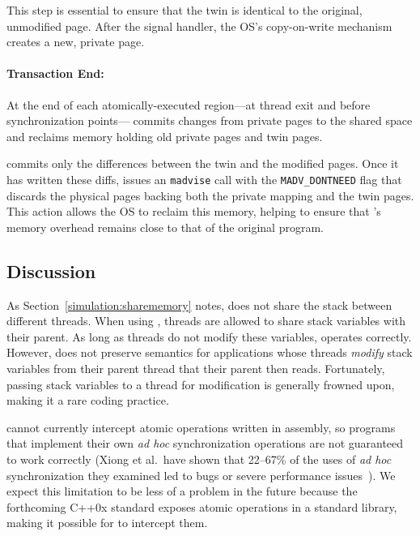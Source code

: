 This step is essential to ensure that the twin is identical to the
original, unmodified page. After the signal handler, the OS's
copy-on-write mechanism creates a new, private page.

\paragraph{Transaction End: } At the end of each atomically-executed
region---at thread exit and before synchronization
points---\sheriff{} commits changes from
private pages to the shared space and reclaims memory holding old
private pages and twin pages.

\sheriff{} commits only the differences between the twin and the
modified pages. Once it has written these diffs, \sheriff{} issues an
\texttt{madvise} call with the \texttt{MADV\_DONTNEED} flag that
discards the physical pages backing both the private mapping and the
twin pages. This action allows the OS to reclaim this memory, helping
to ensure that \sheriff{}'s memory overhead remains close to that of
the original program.

\subsection{Discussion}

As Section~\ref{simulation:sharememory} notes, \sheriff{} does not
share the stack between different threads. When using \pthreads{},
threads are allowed to share stack variables with their parent.
As long as threads do not modify these variables,
\sheriff{} operates correctly. However, \sheriff{} does not preserve
\pthreads{} semantics for applications whose threads
\emph{modify} stack variables from their parent thread that their
parent then reads. Fortunately, passing stack variables to a thread
for modification is generally frowned upon, making it a rare coding
practice.

\sheriff{} cannot currently intercept atomic operations
written in assembly, so programs that implement their own
\emph{ad hoc} synchronization operations are not guaranteed to work
correctly (Xiong et al.\ have shown that 22--67\% of the uses of
\emph{ad hoc} synchronization they examined led to bugs or severe
performance issues~\cite{ad-hoc-considered-harmful}). We expect this
limitation to be less of a problem in the future because the
forthcoming C++0x standard exposes atomic operations in a standard
library, making it possible for \sheriff{} to intercept them.
